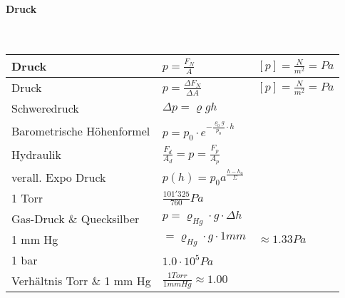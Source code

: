 \paragraph{Druck}\mbox{}\\
\noindent
\begin{tabularx}{\columnwidth}{@{}XXX@{}}
	Druck & $p = \frac{F_N}{A}$ & $[p] = \frac{N}{m^2} = Pa$ \\ \hline                                                            
	Druck & $p = \frac{\Delta F_N}{\Delta A}$ & $[p] = \frac{N}{m^2} = Pa$ \\ \hline                                                            
	Schweredruck & $\Delta p = \varrho gh$ \\ \hline
	Barometrische Höhenformel & $p = p_0 \cdot e^{-\frac{\varrho_0g}{p_0}\cdot h}$ \\ \hline
	Hydraulik & $\frac{F_d}{A_d} = p = \frac{F_p}{A_p}$ \\ \hline
	verall. Expo Druck & $p(h) = p_0 a^{\frac{h-h_0}{\Sigma}}$ \\ \hline
	1 Torr & $\frac{101'325}{760} Pa$ \\ \hline
	Gas-Druck \& Quecksilber & $p = \varrho_{Hg} \cdot g \cdot \Delta h$ \\ \hline
	1 mm Hg & $= \varrho_{Hg} \cdot g \cdot 1mm$ & $\approx 1.33 Pa$ \\ \hline
	1 bar & $1.0\cdot 10^5 Pa$ \\ \hline
	Verhältnis Torr \& 1 mm Hg & $\frac{1 Torr}{1 mm Hg} \approx 1.00$ \\ \hline 
\end{tabularx}

